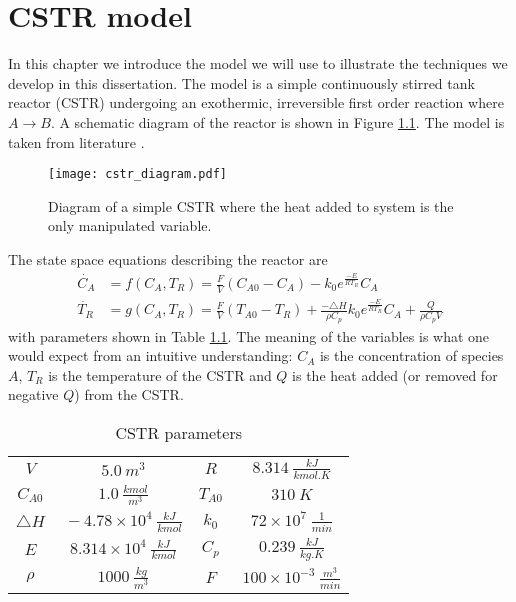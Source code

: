 \chapter{CSTR model}
\label{sec_cstr}
In this chapter we introduce the model we will use to illustrate the techniques we develop in this dissertation. The model is a simple continuously stirred tank reactor (CSTR) undergoing an exothermic, irreversible first order reaction where $A \rightarrow B$. A schematic diagram of the reactor is shown in Figure \ref{fig_cstr_diagram}. The model is taken from literature \cite{cstrmodel}.
\begin{figure}[H] 
\centering
\texttt{[image: cstr\_diagram.pdf]}
\caption{Diagram of a simple CSTR where the heat added to system is the only manipulated variable.}
\label{fig_cstr_diagram}
\end{figure}
The state space equations describing the reactor are 
\begin{equation}
\begin{aligned}
\dot{C_A} &= f(C_A, T_R) =  \frac{F}{V}\left( C_{A0}-C_A \right) - k_0e^{\frac{-E}{RT_R}}C_A \\
\dot{T_R} &= g(C_A, T_R) = \frac{F}{V}\left(T_{A0}-T_R\right) + \frac{-\triangle H}{\rho C_p}k_0e^{\frac{-E}{RT_R}}C_A + \frac{Q}{\rho C_p V}
\end{aligned}
\label{eq_cstrmodel}
\end{equation}
with parameters shown in Table \ref{tab_params}. The meaning of the variables is what one would expect from an intuitive understanding: $C_A$ is the concentration of species $A$, $T_R$ is the temperature of the CSTR and $Q$ is the heat added (or removed for negative $Q$) from the CSTR.
\begin{table}[H]
\begin{center}
\begin{tabular}{c c c c}
\hline
$V$ & $~5.0~m^3$ & $R$ & $~8.314~\frac{kJ}{kmol.K}$ \\
$C_{A0}$ & $~1.0~\frac{kmol}{m^3}$ &$T_{A0}$ & $~310~K$ \\
$\triangle H$ & $~-4.78\times 10^{4}~\frac{kJ}{kmol}$ & $k_{0}$ & $~72\times 10^{7}~\frac{1}{min}$ \\
$E$ & $~8.314\times 10^4~\frac{kJ}{kmol}$ & $C_{p}$ & $~0.239~\frac{kJ}{kg.K}$ \\
$\rho$ & $~1000~\frac{kg}{m^3}$ & 
$F$ & $~100\times 10^{-3}~\frac{m^3}{min}$ \\
\hline
\end{tabular}
\caption{CSTR parameters}
\label{tab_params}
\end{center}
\end{table}
